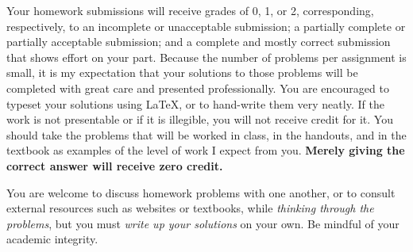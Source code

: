 \documentclass[letterpaper,10pt]{article}
\begin{document}
Your homework submissions will receive grades of 0, 1, or 2, corresponding, respectively, to an incomplete or unacceptable submission; a partially complete or partially acceptable submission; and a complete and mostly correct submission that shows effort on your part. Because the number of problems per assignment is small, it is my expectation that your solutions to those problems will be completed with great care and presented professionally. You are encouraged to typeset your solutions using \LaTeX, or to hand-write them very neatly. If the work is not presentable or if it is illegible, you will not receive credit for it. You should take the problems that will be worked in class, in the handouts, and in the textbook as examples of the level of work I expect from you. \textbf{Merely giving the correct answer will receive zero credit.}

You are welcome to discuss homework problems with one another, or to consult external resources such as websites or textbooks, while \emph{thinking through the problems}, but you must \emph{write up your solutions} on your own. Be mindful of your academic integrity.

\begin{comment}
Homework due dates:

\begin{tabular}{rl}
\textbf{Homework 1}: & Monday, 12 Sept 2016 \\
\textbf{Homework 2}: & Friday, 16 Sept 2016 \\
\textbf{Homework 3}: & Monday, 19 Sept 2016 \\
\textbf{Homework 4}: & Friday, 23 Sept 2016 \\
\textbf{Homework 5}: & Monday, 26 Sept 2016 \\
\textbf{Homework 6}: & Friday, 30 Sept 2016 \\
\textbf{Homework 7}: & Monday, 03 Oct 2016 \\
\textbf{Homework 8}: & Friday, 14 Oct 2016 \\
\textbf{Homework 9}: & Monday, 17 Oct 2016 \\
\textbf{Homework 10}: & Friday, 21 Oct 2016 \\
\textbf{Homework 11}: & Monday, 24 Oct 2016 \\
\textbf{Homework 12}: & Monday, 31 Oct 2016 \\
\textbf{Homework 13}: & Friday, 04 Nov 2016 \\
\textbf{Homework 14}: & Monday, 07 Nov 2016 \\
\textbf{Homework 15}: & Friday, 18 Nov 2016 \\
\textbf{Homework 16}: & Friday, 02 Dec 2016 \\
\textbf{Homework 17}: & Monday, 05 Dec 2016 \\
\end{tabular}
\end{comment}
\end{document}
